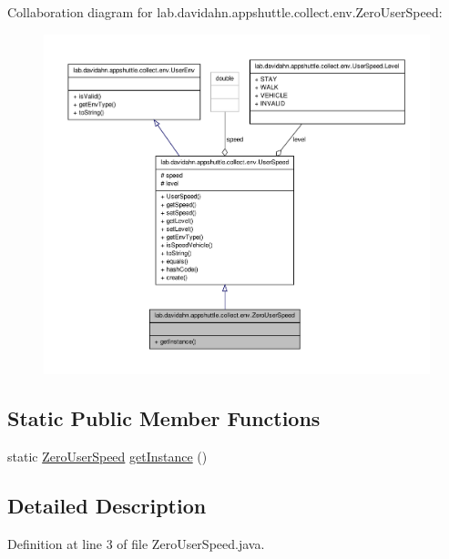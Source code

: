 \-Collaboration diagram for lab.\-davidahn.\-appshuttle.\-collect.\-env.\-Zero\-User\-Speed\-:
\nopagebreak
\begin{figure}[H]
\begin{center}
\leavevmode
\includegraphics[width=350pt]{classlab_1_1davidahn_1_1appshuttle_1_1collect_1_1env_1_1_zero_user_speed__coll__graph}
\end{center}
\end{figure}
\subsection*{\-Static \-Public \-Member \-Functions}
\begin{DoxyCompactItemize}
\item 
static \hyperlink{classlab_1_1davidahn_1_1appshuttle_1_1collect_1_1env_1_1_zero_user_speed}{\-Zero\-User\-Speed} \hyperlink{classlab_1_1davidahn_1_1appshuttle_1_1collect_1_1env_1_1_zero_user_speed_aa5934f4f673bb3b59c98aae43e3537ca}{get\-Instance} ()
\end{DoxyCompactItemize}


\subsection{\-Detailed \-Description}


\-Definition at line 3 of file \-Zero\-User\-Speed.\-java.



